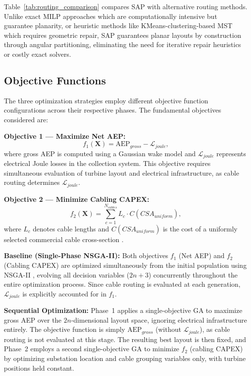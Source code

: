 \documentclass[format=sigconf,anonymous=true,review=true]{acmart}
\begin{document}
Table~\ref{tab:routing_comparison} compares SAP with alternative routing methods. Unlike exact MILP approaches \cite{fischetti2023integrated, Fischetti2015MILP} which are computationally intensive but guarantee planarity, or heuristic methods like KMeans-clustering-based MST \cite{Machado2024Hybrid} which requires geometric repair, SAP guarantees planar layouts by construction through angular partitioning, eliminating the need for iterative repair heuristics or costly exact solvers.

\subsection{Objective Functions}

The three optimization strategies employ different objective function configurations across their respective phases. The fundamental objectives considered are:

\textbf{Objective 1 — Maximize Net AEP:}
\begin{equation}
f_1(\mathbf{X}) = \text{AEP}_{gross} - \mathcal{L}_{joule},
\end{equation}
where gross AEP is computed using a Gaussian wake model \cite{Bastankhah2014Gaussian, Bastankhah2016Gaussian} and $\mathcal{L}_{joule}$ represents electrical Joule losses in the collection system. This objective requires simultaneous evaluation of turbine layout and electrical infrastructure, as cable routing determines $\mathcal{L}_{joule}$.



\textbf{Objective 2 — Minimize Cabling CAPEX:}
\begin{equation}
f_2(\mathbf{X}) = \sum_{c=1}^{N_{cables}} L_c \cdot C(CSA_{\mathit{uniform}}),
\end{equation}
where $L_c$ denotes cable lengths and $C(CSA_\mathit{uniform})$ is the cost of a uniformly selected commercial cable cross-section \cite{Nakhai2023Electrical}.

\textbf{Baseline (Single-Phase NSGA-II):} Both objectives $f_1$ (Net AEP) and $f_2$ (Cabling CAPEX) are optimized simultaneously from the initial population using NSGA-II \cite{Deb2002NSGA2}, evolving all decision variables ($2n+3$) concurrently throughout the entire optimization process. Since cable routing is evaluated at each generation, $\mathcal{L}_{joule}$ is explicitly accounted for in $f_1$.

\textbf{Sequential Optimization:} Phase~1 applies a single-objective GA to maximize gross AEP over the $2n$-dimensional layout space, ignoring electrical infrastructure entirely. The objective function is simply $\text{AEP}_{gross}$ (without $\mathcal{L}_{joule}$), as cable routing is not evaluated at this stage. The resulting best layout is then fixed, and Phase~2 employs a second single-objective GA to minimize $f_2$ (cabling CAPEX) by optimizing substation location and cable grouping variables only, with turbine positions held constant.
\end{document}

